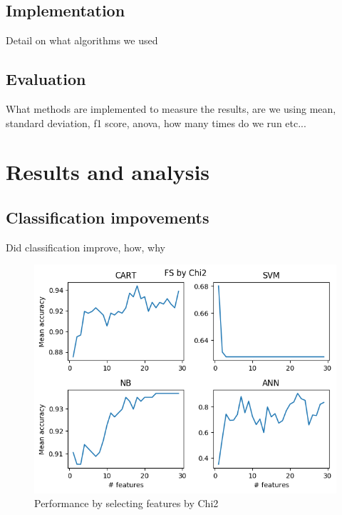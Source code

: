 \documentclass{kththesis}
\begin{document}
\section{Implementation}

Detail on what algorithms we used

\section{Evaluation}

What methods are implemented to measure the results, are we using mean, standard deviation, f1 score, anova, how many times do we run etc...

\chapter{Results and analysis}

\section{Classification impovements}

Did classification improve, how, why

\begin{figure}[ht!]
  \includegraphics[width=\linewidth]{../plots/FS_by_Chi2.png}
  \caption{Performance by selecting features by Chi2}
  \label{fig:chi2}
\end{figure}
\end{document}
